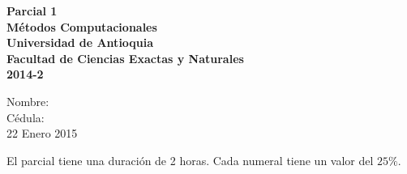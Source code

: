\documentclass[a4,useAMS,usenatbib,usegraphicx,12pt]{article}
\begin{document}
\begin{flushleft}
  \sffamily\bfseries
  {\Large Parcial 1\hspace{5cm}}\LOGO\\
  Métodos Computacionales \\
  Universidad de Antioquia\\
  Facultad de Ciencias Exactas y Naturales\\  
  2014-2\\
  
\hrulefill\par

  Nombre: \\
  Cédula: \\
  \footnotesize 22 Enero 2015

\hrulefill\par
  
  \end{flushleft}



El parcial tiene una duración de 2 horas. Cada numeral tiene un valor del $25\%$.
\end{document}
